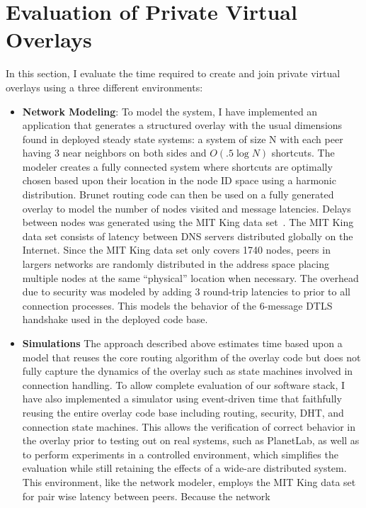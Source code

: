 \section{Evaluation of Private Virtual Overlays}
In this section, I evaluate the time required to create and join private virtual
overlays using a three different environments:

\begin{itemize}
\item \textbf{Network Modeling}: To model the system, I have implemented an
application that generates a structured overlay with the usual dimensions found
in deployed steady state systems: a system of size N with each peer having 3
near neighbors on both sides and $O(.5\log N)$ shortcuts.  The modeler creates a
fully connected system where shortcuts are optimally chosen based upon their
location in the node ID space using a harmonic distribution.  Brunet routing
code can then be used on a fully generated overlay to model the number of
nodes visited and message latencies.  Delays between nodes was generated using
the MIT King data set~\cite{king_data}.  The MIT King data set consists of
latency between DNS servers distributed globally on the Internet.  Since the
MIT King data set only covers 1740 nodes, peers in largers networks are
randomly distributed in the address space placing multiple nodes at the same
``physical'' location when necessary. The overhead due to security was modeled
by adding 3 round-trip latencies to prior to all connection processes. This
models the behavior of the 6-message DTLS handshake used in the deployed code
base.
\item \textbf{Simulations} The approach described above estimates time based
upon a model that reuses the core routing algorithm of the overlay code but
does not fully capture the dynamics of the overlay such as state machines
involved in connection handling.  To allow complete evaluation of our software
stack, I have also implemented a simulator using event-driven time that
faithfully reusing the entire overlay code base including routing, security,
DHT, and connection state machines.  This allows the verification of correct
behavior in the overlay prior to testing out on real systems, such as PlanetLab,
as well as to perform experiments in a controlled environment, which simplifies
the evaluation while still retaining the effects of a wide-are distributed
system.  This environment, like the network modeler, employs the MIT King data
set~\cite{king_data} for pair wise latency between peers.  Because the network

\end{itemize}
